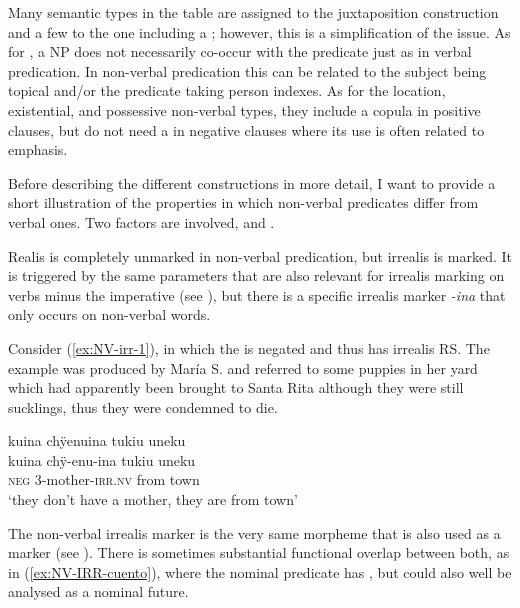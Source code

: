 Many semantic types in the table are assigned to the juxtaposition construction and a few to the one including a ; however, this is a simplification of the issue. As for , a  NP does not necessarily co-occur with the predicate just as in verbal predication. In non-verbal predication this can be related to the subject being topical and/or the predicate taking person indexes. As for the location, existential, and possessive non-verbal types, they include a copula in positive clauses, but do not need a  in negative clauses where its use is often related to emphasis.

Before describing the different constructions in more detail, I want to provide a short illustration of the properties in which non-verbal predicates differ from verbal ones. Two factors are involved,  and .

Realis is completely unmarked in non-verbal predication, but irrealis is marked. It is triggered by the same parameters that are also relevant for irrealis marking on verbs minus the imperative (see ), but there is a specific irrealis marker \textit{-ina} that only occurs on non-verbal words.

Consider (\ref{ex:NV-irr-1}), in which the  is negated and thus has irrealis RS. The example was produced by María S. and referred to some puppies in her yard which had apparently been brought to Santa Rita although they were still sucklings, thus they were condemned to die.

\ea\label{ex:NV-irr-1}
\begingl
\glpreamble kuina chÿenuina tukiu uneku\\
\gla kuina chÿ-enu-ina tukiu uneku\\
\glb \textsc{neg} 3-mother-\textsc{irr.nv} from town\\
\glft ‘they don’t have a mother, they are from town’
\endgl
\trailingcitation{[rxx-e120511l.363]}
\xe

The non-verbal irrealis marker is the very same morpheme that is also used as a  marker (see ). There is sometimes substantial functional overlap between both, as in (\ref{ex:NV-IRR-cuento}), where the nominal predicate has , but could also well be analysed as a nominal future.

